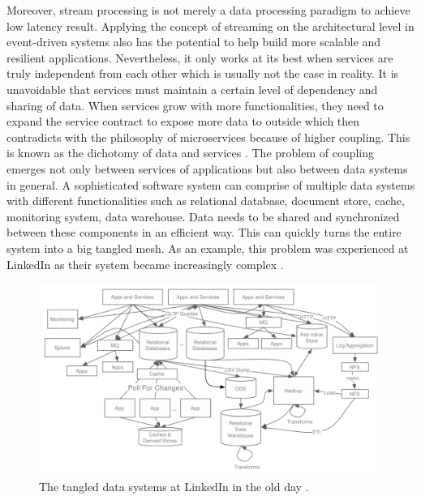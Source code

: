 Moreover, stream processing is not merely a data processing paradigm to achieve low latency result. Applying the concept of streaming on the architectural level in event-driven systems also has the potential to help build more scalable and resilient applications. Nevertheless, it only works at its best when services are truly independent from each other which is usually not the case in reality. It is unavoidable that services must maintain a certain level of dependency and sharing of data. When services grow with more functionalities, they need to expand the service contract to expose more data to outside which then contradicts with the philosophy of microservices because of higher coupling. This is known as the dichotomy of data and services \cite{stopford2018designing}. The problem of coupling emerges not only between services of applications but also between data systems in general. A sophisticated software system can comprise of multiple data systems with different functionalities such as relational database, document store, cache, monitoring system, data warehouse. Data needs to be shared and synchronized between these components in an efficient way. This can quickly turns the entire system into a big tangled mesh. As an example, this problem was experienced at LinkedIn as their system became increasingly complex \cite{eventstreamingplatform}. 

\begin{figure}[h]
	\includegraphics[width=\linewidth]{images/linkedin-data-flow-ugly.png}
	\caption{The tangled data systems at LinkedIn in the old day \cite{eventstreamingplatform}.}
	\label{fig:tangledsystem}
\end{figure}

